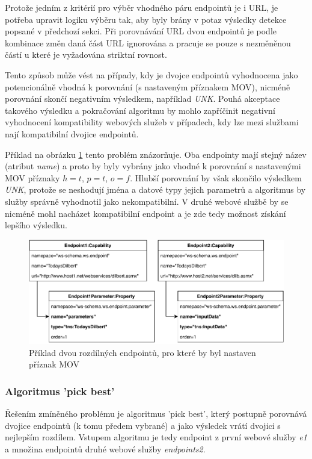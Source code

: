 \documentclass[czech,DP]{thesiskiv}
\begin{document}
Protože jedním z kritérií pro výběr vhodného páru endpointů je i URL, je potřeba upravit logiku výběru tak, aby byly brány v potaz výsledky detekce popsané v předchozí sekci. Při porovnávání URL dvou endpointů je podle kombinace změn daná část URL ignorována a pracuje se pouze s nezměněnou částí u které je vyžadována striktní rovnost.

Tento způsob může vést na případy, kdy je dvojce endpointů vyhodnocena jako potencionálně vhodná k porovnání (s nastaveným příznakem MOV), nicméně porovnání skončí negativním výsledkem, například \textit{UNK}. Pouhá akceptace takového výsledku a pokračování algoritmu by mohlo zapříčinit negativní vyhodnocení kompatibility webových služeb v případech, kdy lze mezi službami nají kompatibilní dvojice endpointů.

Příklad na obrázku \ref{fig:mov-bad-example} tento problém znázorňuje. Oba endpointy mají stejný název (atribut \textit{name}) a proto by byly vybrány jako vhodné k porovnání s nastavenými MOV příznaky $h=t$, $p=t$, $o=f$. Hlubší porovnání by však skončilo výsledkem \textit{UNK}, protože se neshodují jména a datové typy jejich parametrů a algoritmus by služby správně vyhodnotil jako nekompatibilní. V druhé webové službě by se nicméně mohl nacházet kompatibilní endpoint a je zde tedy možnost získání lepšího výsledku.

\begin{figure}[h]
	\centering
	\includegraphics[width=\linewidth]{mov-example-bad}
	\caption{Příklad dvou rozdílných endpointů, pro které by byl nastaven příznak MOV}
	\label{fig:mov-bad-example}
\end{figure}

\subsubsection{Algoritmus 'pick best'}
Řešením zmíněného problému je algoritmus 'pick  best', který postupně porovnává dvojice endpointů (k tomu předem vybrané) a jako výsledek vrátí dvojici s nejlepším rozdílem. Vstupem algoritmu je tedy endpoint z první webové služby \textit{e1} a množina endpointů druhé webové služby \textit{endpoints2}. 
\end{document}
